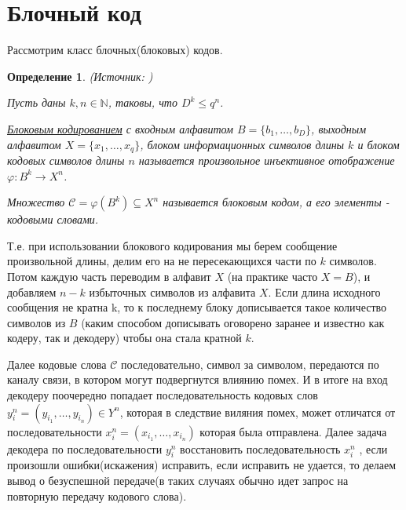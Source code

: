 \documentclass[14pt,a4paper,russian]{article}
\newtheorem{opr}{Определение}[section]
\newcommand{\N}{\mathbb{N}}
\begin{document}
\section{Блочный код}
Рассмотрим класс блочных(блоковых) кодов.
\begin{opr}
	(Источник: \cite{Checheta})
	
	Пусть даны $k, n \in \N$,  таковы, что $D^k \le q^n$.
	
	\uline{Блоковым кодированием} с входным алфавитом  $B = \{b_1, \ldots, b_D\}$, выходным алфавитом  $X = \{x_1, \ldots, x_q\}$, блоком информационных символов длины $k$ и блоком кодовых символов длины $n$ называется произвольное инъективное отображение $\varphi \colon B^k \rightarrow X^n$.
	
	Множество $\mathcal{C} = \varphi(B^k) \subseteq X^n$ называется блоковым кодом, а его элементы - кодовыми словами.
\end{opr}
Т.е. при использовании блокового кодирования мы берем сообщение произвольной длины, делим его на не пересекающихся части по $k$ символов. Потом каждую часть переводим в алфавит $X$ (на практике часто $X = B$), и добавляем $n-k$ избыточных символов из алфавита $X$. Если длина исходного сообщения не кратна k, то к последнему блоку дописывается такое количество символов из $B$ (каким способом дописывать оговорено заранее и известно как кодеру, так и декодеру) чтобы она стала кратной $k$.

Далее кодовые слова $\mathcal{C}$ последовательно, символ за символом, передаются по каналу связи, в котором могут подвергнутся влиянию помех. И в итоге на вход декодеру поочередно попадает последовательность кодовых слов $y_i^n = (y_{i_1}, \ldots, y_{i_n}) \in Y^n$, которая в следствие виляния помех, может отличатся от последовательности $x_i^n = (x_{i_1}, \ldots, x_{i_n})$ которая была отправлена. Далее задача декодера по последовательности $y_i^n$ восстановить последовательность $x_i^n$ , если произошли ошибки(искажения) исправить, если исправить не удается, то делаем вывод о безуспешной передаче(в таких случаях обычно идет запрос на повторную передачу кодового слова).
\end{document}
